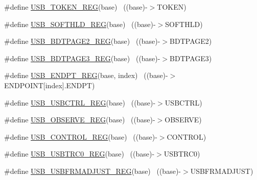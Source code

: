 \begin{DoxyCompactItemize}
\item 
\#define \hyperlink{group___u_s_b___register___accessor___macros_ga58de1b6987e899f3460e032f9f28bf99}{U\+S\+B\+\_\+\+T\+O\+K\+E\+N\+\_\+\+R\+EG}(base)                                        ~((base)-\/$>$T\+O\+K\+EN)
\item 
\#define \hyperlink{group___u_s_b___register___accessor___macros_ga09aac565b7f5e742a25732100fbf8889}{U\+S\+B\+\_\+\+S\+O\+F\+T\+H\+L\+D\+\_\+\+R\+EG}(base)                                    ~((base)-\/$>$S\+O\+F\+T\+H\+LD)
\item 
\#define \hyperlink{group___u_s_b___register___accessor___macros_gaa6efc82627e2983372a9cafa08d3e646}{U\+S\+B\+\_\+\+B\+D\+T\+P\+A\+G\+E2\+\_\+\+R\+EG}(base)                                  ~((base)-\/$>$B\+D\+T\+P\+A\+G\+E2)
\item 
\#define \hyperlink{group___u_s_b___register___accessor___macros_ga2b3f2b53d240a5769557b3bf86c2e3ea}{U\+S\+B\+\_\+\+B\+D\+T\+P\+A\+G\+E3\+\_\+\+R\+EG}(base)                                  ~((base)-\/$>$B\+D\+T\+P\+A\+G\+E3)
\item 
\#define \hyperlink{group___u_s_b___register___accessor___macros_ga2d64e95d192db6bf8f035cc6a7cf48d6}{U\+S\+B\+\_\+\+E\+N\+D\+P\+T\+\_\+\+R\+EG}(base,  index)                            ~((base)-\/$>$E\+N\+D\+P\+O\+I\+NT\mbox{[}index\mbox{]}.E\+N\+D\+PT)
\item 
\#define \hyperlink{group___u_s_b___register___accessor___macros_ga73ac0c0c60bf6fd8e2ed9dee3f2aa436}{U\+S\+B\+\_\+\+U\+S\+B\+C\+T\+R\+L\+\_\+\+R\+EG}(base)                                    ~((base)-\/$>$U\+S\+B\+C\+T\+RL)
\item 
\#define \hyperlink{group___u_s_b___register___accessor___macros_ga2ee1aa6fd76b49402bf4a1799687e944}{U\+S\+B\+\_\+\+O\+B\+S\+E\+R\+V\+E\+\_\+\+R\+EG}(base)                                    ~((base)-\/$>$O\+B\+S\+E\+R\+VE)
\item 
\#define \hyperlink{group___u_s_b___register___accessor___macros_ga9c4c4c5d0d19933e8c0ab5ac5dfe48a5}{U\+S\+B\+\_\+\+C\+O\+N\+T\+R\+O\+L\+\_\+\+R\+EG}(base)                                    ~((base)-\/$>$C\+O\+N\+T\+R\+OL)
\item 
\#define \hyperlink{group___u_s_b___register___accessor___macros_gaf054f3a4251da894e8431bb28eceaa6e}{U\+S\+B\+\_\+\+U\+S\+B\+T\+R\+C0\+\_\+\+R\+EG}(base)                                    ~((base)-\/$>$U\+S\+B\+T\+R\+C0)
\item 
\#define \hyperlink{group___u_s_b___register___accessor___macros_ga7976793373bcef48e82870e9391f7f55}{U\+S\+B\+\_\+\+U\+S\+B\+F\+R\+M\+A\+D\+J\+U\+S\+T\+\_\+\+R\+EG}(base)                          ~((base)-\/$>$U\+S\+B\+F\+R\+M\+A\+D\+J\+U\+ST)

\end{DoxyCompactItemize}
